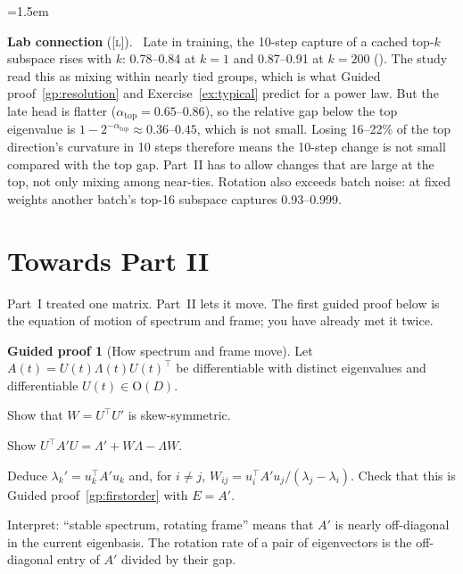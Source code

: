 \documentclass[11pt,a4paper]{article}
\newcommand{\Orth}{\mathrm{O}}
\newcommand{\study}[1]{\path{#1}}
\newcommand{\evL}{\textsc{[l]}}
\theoremstyle{plain}
\theoremstyle{definition}
\newtheorem{guided}[proposition]{Guided proof}
\theoremstyle{remark}
\newenvironment{labbox}{\begin{list}{}{\leftmargin=1.5em\rightmargin=0pt\topsep=6pt}\small\item[]%
  \textcolor{green!35!black}{\textbf{Lab connection} (\evL).}\ }{\end{list}}
\begin{document}
\begin{labbox}
Late in training, the 10-step capture of a cached top-$k$ subspace rises with $k$: 0.78--0.84 at $k=1$ and 0.87--0.91
at $k=200$ (\study{spectral_rotation_20261020}). The study read this as mixing within nearly tied groups, which is
what Guided proof~\ref{gp:resolution} and Exercise~\ref{ex:typical} predict for a power law. But the late head is
flatter ($\alpha_{\text{top}}=0.65$--$0.86$), so the relative gap below the top eigenvalue is
$1-2^{-\alpha_{\text{top}}}\approx0.36$--$0.45$, which is not small. Losing 16--22\% of the top direction's curvature
in 10 steps therefore means the 10-step change is not small compared with the top gap. Part~II has to allow changes
that are large at the top, not only mixing among near-ties. Rotation also exceeds batch noise: at fixed weights
another batch's top-16 subspace captures 0.93--0.999.
\end{labbox}

\section{Towards Part II}\label{sec:next}

Part~I treated one matrix. Part~II lets it move. The first guided proof below is the equation of motion of spectrum
and frame; you have already met it twice.

\begin{guided}[How spectrum and frame move]\label{gp:motion}
Let $A(t)=U(t)\Lambda(t)U(t)^\top$ be differentiable with distinct eigenvalues and differentiable $U(t)\in\Orth(D)$.
\begin{steps}
\item Show that $W=U^\top U'$ is skew-symmetric.
\item Show $U^\top A'U=\Lambda'+W\Lambda-\Lambda W$.
\item Deduce $\lambda_k'=u_k^\top A'u_k$ and, for $i\ne j$, $W_{ij}=u_i^\top A'u_j/(\lambda_j-\lambda_i)$. Check that
  this is Guided proof~\ref{gp:firstorder} with $E=A'$.
\item Interpret: ``stable spectrum, rotating frame'' means that $A'$ is nearly off-diagonal in the current eigenbasis.
  The rotation rate of a pair of eigenvectors is the off-diagonal entry of $A'$ divided by their gap.
\end{steps}
\end{guided}
\end{document}
